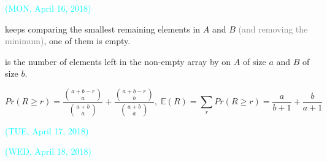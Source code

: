 \begin{frame}{}
  {\vspace{-0.30cm} \centerline{\textcolor{cyan}{\small (MON, April 16, 2018)}}}

  \vspace{0.50cm}
   keeps comparing the smallest remaining elements in $A$ and $B$
  {\small \textcolor{gray}{(and removing the minimum)}},  one of them is empty.

  \begin{definition}[$R$]
     is the number of elements left in the non-empty array by 
    on $A$ of size $a$ and $B$ of size $b$.
  \end{definition}

  \begin{theorem}
    \vspace{-0.50cm}
    \[
      Pr(R \ge r) = \frac{\binom{a + b - r}{a}}{\binom{a + b}{a}} + \frac{\binom{a + b - r}{b}}{\binom{a + b}{a}},
      \; \mathbb{E}(R) = \sum_{r} Pr(R \ge r) = \frac{a}{b+1} + \frac{b}{a+1}
    \]
  \end{theorem}
\end{frame}

\begin{frame}{}
  {\vspace{-0.50cm} \centerline{\textcolor{cyan}{\small (TUE, April 17, 2018)}}}

\end{frame}

\begin{frame}{}
  {\vspace{-0.50cm} \centerline{\textcolor{cyan}{\small (WED, April 18, 2018)}}}

\end{frame}
